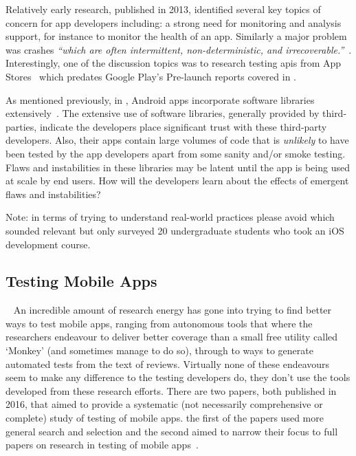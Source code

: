 Relatively early research, published in 2013, identified several key topics of concern for app developers including: a strong need for monitoring and analysis support, for instance to monitor the health of an app. Similarly a major problem was crashes \emph{``which are often intermittent, non-deterministic, and irrecoverable.''}~. Interestingly, one of the discussion topics was to research testing \acrshort{api}s from App Stores~ which predates Google Play's Pre-launch reports covered in .


As mentioned previously, in , Android apps incorporate software libraries extensively~. The extensive use of software libraries, generally provided by third-parties, indicate the developers place significant trust with these third-party developers. Also, their apps contain large volumes of code that is \emph{unlikely} to have been tested by the app developers apart from some sanity and/or smoke testing. Flaws and instabilities in these libraries may be latent until the app is being used at scale by end users. How will the developers learn about the effects of emergent flaws and instabilities?

Note: in terms of trying to understand real-world practices please avoid \textcite{santos2016_investigating_the_adoption_of_agile_practices_by_20_undergrad_students_in_mobile_app_devt} which sounded relevant but only surveyed 20 undergraduate students who took an iOS development course. 


\subsection{Testing Mobile Apps}~\label{rw-testing-mobile-apps-topic}
An incredible amount of research energy has gone into trying to find better ways to test mobile apps, ranging from autonomous tools that where the researchers endeavour to deliver better coverage than a small free utility called `Monkey' (and sometimes manage to do so), through to ways to generate automated tests from the text of reviews. Virtually none of these endeavours seem to make any difference to the testing developers do, they don't use the tools developed from these research efforts. There are two papers, both published in 2016, that aimed to provide a systematic (not necessarily comprehensive or complete) study of testing of mobile apps. the first of the papers used more general search and selection   and the second aimed to narrow their focus to full papers on research in testing of mobile apps~. 

